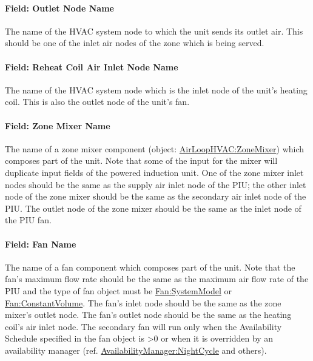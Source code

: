 \paragraph{Field: Outlet Node Name}\label{field-outlet-node-name}

The name of the HVAC system node to which the unit sends its outlet air. This should be one of the inlet air nodes of the zone which is being served.

\paragraph{Field: Reheat Coil Air Inlet Node Name}\label{field-reheat-coil-air-inlet-node-name}

The name of the HVAC system node which is the inlet node of the unit's heating coil. This is also the outlet node of the unit's fan.

\paragraph{Field: Zone Mixer Name}\label{field-zone-mixer-name}

The name of a zone mixer component (object: \hyperref[airloophvaczonemixer]{AirLoopHVAC:ZoneMixer}) which composes part of the unit. Note that some of the input for the mixer will duplicate input fields of the powered induction unit. One of the zone mixer inlet nodes should be the same as the supply air inlet node of the PIU; the other inlet node of the zone mixer should be the same as the secondary air inlet node of the PIU. The outlet node of the zone mixer should be the same as the inlet node of the PIU fan.

\paragraph{Field: Fan Name}\label{field-fan-name-1}

The name of a fan component which composes part of the unit. Note that the fan's maximum flow rate should be the same as the maximum air flow rate of the PIU and the type of fan object must be \hyperref[fansystemmodel]{Fan:SystemModel} or \hyperref[fanconstantvolume]{Fan:ConstantVolume}. The fan's inlet node should be the same as the zone mixer's outlet node. The fan's outlet node should be the same as the heating coil's air inlet node. The secondary fan will run only when the Availability Schedule specified in the fan object is >0 or when it is overridden by an availability manager (ref. \hyperref[availabilitymanagernightcycle]{AvailabilityManager:NightCycle} and others).

